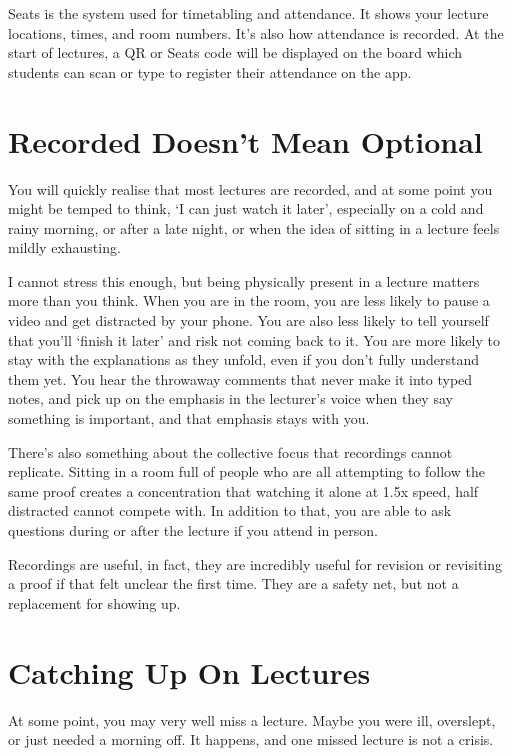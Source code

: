 Seats is the system used for timetabling and attendance. It shows your lecture locations, times, and room numbers. It's also how attendance is recorded. At the start of lectures, a QR or Seats code will be displayed on the board which students can scan or type to register their attendance on the app. 

\section{Recorded Doesn't Mean Optional}

You will quickly realise that most lectures are recorded, and at some point you might be temped to think, `I can just watch it later', especially on a cold and rainy morning, or after a late night, or when the idea of sitting in a lecture feels mildly exhausting. 

I cannot stress this enough, but being physically present in a lecture matters more than you think. When you are in the room, you are less likely to pause a video and get distracted by your phone. You are also less likely to tell yourself that you'll `finish it later' and risk not coming back to it. You are more likely to stay with the explanations as they unfold, even if you don't fully understand them yet. You hear the throwaway comments that never make it into typed notes, and pick up on the emphasis in the lecturer's voice when they say something is important, and that emphasis stays with you. 

There's also something about the collective focus that recordings cannot replicate. Sitting in a room full of people who are all attempting to follow the same proof creates a concentration that watching it alone at 1.5x speed, half distracted cannot compete with. In addition to that, you are able to ask questions during or after the lecture if you attend in person. 

Recordings are useful, in fact, they are incredibly useful for revision or revisiting a proof if that felt unclear the first time. They are a safety net, but not a replacement for showing up. 

\section{Catching Up On Lectures}

At some point, you may very well miss a lecture. Maybe you were ill, overslept, or just needed a morning off. It happens, and one missed lecture is not a crisis.

